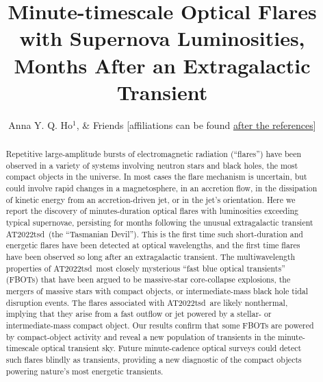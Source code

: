 \documentclass{nature_plusfigure}
\title{Minute-timescale Optical Flares with Supernova Luminosities, Months After an Extragalactic Transient}
\author{Anna Y. Q. Ho$^{1}$,
\& Friends
[affiliations can be found \hyperref[sec:affiliations]{after the references}]
	}
\newcommand{\at}{AT2022tsd}
\begin{document}
\maketitle

\begin{abstract}

Repetitive large-amplitude bursts of electromagnetic radiation (``flares'') have been observed in a variety of systems involving neutron stars and black holes\cite{Fender1997,Hurley1999,Marrone2008,Racusin2008,Kasliwal2008,CastroTirado2008,Stefanescu2008,Nesci2021}, the most compact objects in the universe. In most cases the flare mechanism is uncertain, but could involve rapid changes in a magnetosphere\cite{Hurley1999,CastroTirado2008,Stefanescu2008}, in an accretion flow\cite{Fender2004,Yuan2014}, in the dissipation of kinetic energy from an accretion-driven jet\cite{Racusin2008}, or in the jet's orientation\cite{Raiteri2017}.
Here we report the discovery of minutes-duration optical flares with luminosities exceeding typical supernovae, persisting for months following the unusual extragalactic transient \at\ (the ``Tasmanian Devil'').
This is the first time such short-duration and energetic flares have been detected at optical wavelengths, and the first time flares have been observed so long after an extragalactic transient.
The multiwavelength properties of \at\ most closely mysterious ``fast blue optical transients'' (FBOTs\cite{Prentice2018,RiveraSandoval2018,Perley2019,Margutti2019,Ho2019,Coppejans2020,Ho2020_Koala,Perley2021,Bright2022,Ho2022_AT2020xnd,Yao2022}) that have been argued to be massive-star core-collapse explosions\cite{Prentice2018,Margutti2019,Perley2019}, the mergers of massive stars with compact objects\cite{Metzger2022}, or intermediate-mass black hole tidal disruption events\cite{Kuin2019,Perley2019}. The flares associated with \at\ are likely nonthermal, implying that they arise from a fast outflow or jet powered by a stellar- or intermediate-mass compact object.
Our results confirm that some FBOTs are powered by compact-object activity
and reveal a new population of transients in the minute-timescale optical transient sky.
Future minute-cadence optical surveys\cite{Law2022} could detect such flares blindly as transients,
providing a new diagnostic of the compact objects powering nature's most energetic transients.

\end{abstract}
\end{document}

